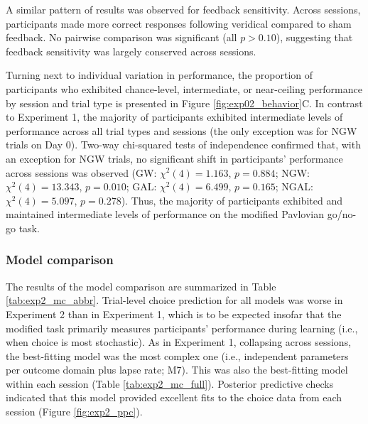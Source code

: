 \documentclass[a4paper,12pt]{article}
\begin{document}
\begin{refsection}[main]
A similar pattern of results was observed for feedback sensitivity. Across sessions, participants made more correct responses following veridical compared to sham feedback. No pairwise comparison was significant (all $p > 0.10$), suggesting that feedback sensitivity was largely conserved across sessions.

Turning next to individual variation in performance, the proportion of participants who exhibited chance-level, intermediate, or near-ceiling performance by session and trial type is presented in Figure \ref{fig:exp02_behavior}C. In contrast to Experiment 1, the majority of participants exhibited intermediate levels of performance across all trial types and sessions (the only exception was for NGW trials on Day 0). Two-way chi-squared tests of independence confirmed that, with an exception for NGW trials, no significant shift in participants' performance across sessions was observed (GW: $\chi^2 (4) = 1.163$, $p = 0.884$; NGW: $\chi^2 (4) = 13.343$, $p = 0.010$; GAL: $\chi^2 (4) = 6.499$, $p = 0.165$; NGAL: $\chi^2 (4) = 5.097$, $p = 0.278$). Thus, the majority of participants exhibited and maintained intermediate levels of performance on the modified Pavlovian go/no-go task.

\subsubsection*{Model comparison}

The results of the model comparison are summarized in Table \ref{tab:exp2_mc_abbr}. Trial-level choice prediction for all models was worse in Experiment 2 than in Experiment 1, which is to be expected insofar that the modified task primarily measures participants' performance during learning (i.e., when choice is most stochastic). As in Experiment 1, collapsing across sessions, the best-fitting model was the most complex one (i.e., independent parameters per outcome domain plus lapse rate; M7). This was also the best-fitting model within each session (Table \ref{tab:exp2_mc_full}). Posterior predictive checks indicated that this model provided excellent fits to the choice data from each session (Figure \ref{fig:exp2_ppc}). 


\end{refsection}
\end{document}
